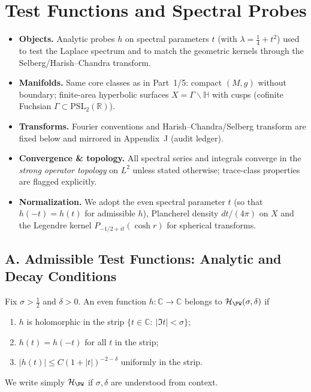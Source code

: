 \section{Test Functions and Spectral Probes}
\label{sec:test-functions}

\begin{tcolorbox}[colback=gray!5,colframe=gray!35,
  title=Scope \& Assumptions (ZNB-9+++ • MEA-Core-SS • enforced)]
\begin{itemize}
  \item \textbf{Objects.} Analytic probes $h$ on spectral parameters $t$ (with $\lambda=\tfrac14+t^2$) used to test the Laplace spectrum and to match the geometric kernels through the Selberg/Harish–Chandra transform.
  \item \textbf{Manifolds.} Same core classes as in Part~1/5: compact $(M,g)$ without boundary; finite-area hyperbolic surfaces $X=\Gamma\backslash\mathbb H$ with cusps (cofinite Fuchsian $\Gamma\subset\mathrm{PSL}_2(\mathbb R)$).
  \item \textbf{Transforms.} Fourier conventions and Harish–Chandra/Selberg transform are fixed below and mirrored in Appendix~J (audit ledger).
  \item \textbf{Convergence \& topology.} All spectral series and integrals converge in the \emph{strong operator topology} on $L^2$ unless stated otherwise; trace-class properties are flagged explicitly.
  \item \textbf{Normalization.} We adopt the even spectral parameter $t$ (so that $h(-t)=h(t)$ for admissible $h$), Plancherel density $dt/(4\pi)$ on $X$ and the Legendre kernel $P_{-1/2+it}(\cosh r)$ for spherical transforms.
\end{itemize}
\end{tcolorbox}

\subsection*{A. Admissible Test Functions: Analytic and Decay Conditions}
\label{subsec:admissible-h}

\begin{definition}
\label{def:admissible}
Fix $\sigma>\tfrac12$ and $\delta>0$. An even function $h:\mathbb C\to\mathbb C$ belongs to $\mathcal H_{\PW}(\sigma,\delta)$ if
\begin{enumerate}[label=(\roman*)]
  \item $h$ is holomorphic in the strip $\{t\in\mathbb C:\ |\Im t|<\sigma\}$;
  \item $h(t)=h(-t)$ for all $t$ in the strip;
  \item $|h(t)|\le C (1+|t|)^{-2-\delta}$ uniformly in the strip.
\end{enumerate}
We write simply $\mathcal H_{\PW}$ if $\sigma,\delta$ are understood from context.
\end{definition}

